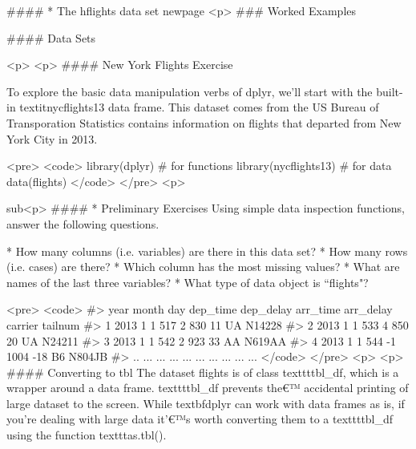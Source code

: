####        * {The hflights data set}
	newpage
	<p>
### {Worked Examples}
	
#### {Data Sets}

<p>
	<p>
#### {New York Flights Exercise}
	
	To explore the basic data manipulation verbs of dplyr, we'll start with the built-in textit{nycflights13} data frame. This dataset comes from the US Bureau of Transporation Statistics contains information on flights that departed from New York City in 2013. 
	
	
	<pre>
		<code>
		library(dplyr) # for functions
		library(nycflights13) # for data
		data(flights)
		</code>
	</pre>
<p>
	
	sub<p>
####        * {Preliminary Exercises}
	Using simple data inspection functions, answer the following questions. %
	
		         * How many columns (i.e. variables) are there in this data set?
		         * How many rows (i.e. cases) are there?
		         * Which column has the most missing values?
		         * What are names of the last three variables?
		         * What type of data object is ``flights"?
	
	
	<pre>
		<code>
		#>    year month day dep_time dep_delay arr_time arr_delay carrier tailnum
		#> 1  2013     1   1      517         2      830        11      UA  N14228
		#> 2  2013     1   1      533         4      850        20      UA  N24211
		#> 3  2013     1   1      542         2      923        33      AA  N619AA
		#> 4  2013     1   1      544        -1     1004       -18      B6  N804JB
		#> ..  ...   ... ...      ...       ...      ...       ...     ...     ...
		</code>
	</pre>
<p>
	<p>
#### {Converting to tbl}
	The dataset flights is of class texttt{tbl_df}, which is a wrapper around a data frame. texttt{tbl_df} prevents the€™ accidental printing of large dataset to the screen. While textbf{dplyr} can work with data frames as is, if you're dealing with large data it'€™s worth converting them to a texttt{tbl_df} using the function texttt{as.tbl()}.
	
